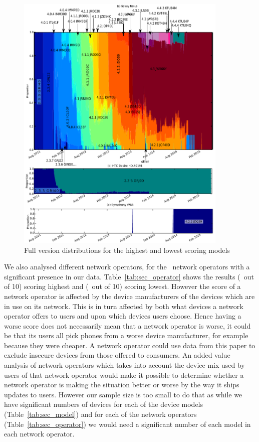 \begin{figure}
 \centering
 \includegraphics[width=0.9\textwidth]{figures/full_version_comp.pdf}
 \caption{Full version distributions for the highest and lowest scoring models}
 \label{fig:full_version_comp}
\end{figure}

\daTabSecScoresoperator
We also analysed different network operators, for the \daNumSigOperators\ network operators with a significant presence in our data.
Table~\ref{tab:sec_operator} shows the results \emph{\daSecScoreBestoperator} (\daSecScoreBestoperatorScore\ out of 10) scoring highest and \emph{\daSecScoreWorstoperator} (\daSecScoreWorstoperatorScore\ out of 10) scoring lowest.
However the score of a network operator is affected by the device manufacturers of the devices which are in use on its network.
This is in turn affected by both what devices a network operator offers to users and upon which devices users choose.
Hence having a worse score does not necessarily mean that a network operator is worse, it could be that its users all pick phones from a worse device manufacturer, for example because they were cheaper.
A network operator could use data from this paper to exclude insecure devices from those offered to consumers.
An added value analysis of network operators which takes into account the device mix used by users of that network operator would make it possible to determine whether a network operator is making the situation better or worse by the way it ships updates to users.
However our sample size is too small to do that as while we have significant numbers of devices for each of the device models (Table~\ref{tab:sec_model}) and for each of the network operators (Table~\ref{tab:sec_operator}) we would need a significant number of each model in each network operator.


